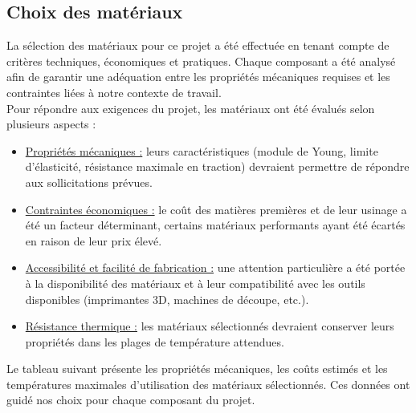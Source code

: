 \subsection{Choix des matériaux}
La sélection des matériaux pour ce projet a été effectuée en tenant compte de critères techniques, économiques et pratiques. Chaque composant a été analysé afin de garantir une adéquation entre les propriétés mécaniques requises et les contraintes liées à notre contexte de travail.\\
Pour répondre aux exigences du projet, les matériaux ont été évalués selon plusieurs aspects :

\begin{itemize}
    \item \underline{Propriétés mécaniques :} leurs caractéristiques (module de Young, limite d’élasticité, résistance maximale en traction) devraient permettre de répondre aux sollicitations prévues.
    \item \underline{Contraintes économiques :} le coût des matières premières et de leur usinage a été un facteur déterminant, certains matériaux performants ayant été écartés en raison de leur prix élevé.
    \item \underline{Accessibilité et facilité de fabrication :} une attention particulière a été portée à la disponibilité des matériaux et à leur compatibilité avec les outils disponibles (imprimantes 3D, machines de découpe, etc.).
    \item \underline{Résistance thermique :} les matériaux sélectionnés devraient conserver leurs propriétés dans les plages de température attendues.\\
\end{itemize}

Le tableau suivant présente les propriétés mécaniques, les coûts estimés et les températures maximales d’utilisation des matériaux sélectionnés. Ces données ont guidé nos choix pour chaque composant du projet.

